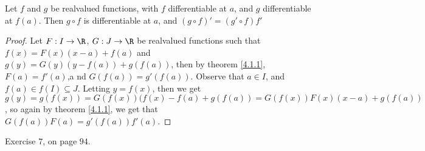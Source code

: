 \begin{theorem}\label{4.2.2}
    Let $f$ and  $g$ be realvalued functions, with  $f$ differentiable at  $a$, 
    and  $g$ differentiable at  $f(a)$. Then  $g \circ f$ is differentiable at  $a$, 
    and  $(g \circ f)'=(g' \circ f)f'$
\end{theorem}
\begin{proof}
    Let $F:I \rightarrow \R$, $G: J \rightarrow \R$ be realvalued functions such that $f(x)=F(x)(x-a)+f(a)$ 
    and  $g(y)=G(y)(y-f(a))+g(f(a))$, then by theorem \ref{4.1.1},  $F(a)=f'(a)$,a nd  $G(f(a))=g'(f(a))$. 
    Observe that $a \in I$, and  $f(a) \in f(I) \subseteq J$. Letting  $y=f(x)$, then we get 
    $g(y)=g(f(x))=G(f(x))(f(x)-f(a)+g(f(a))=G(f(x))F(x)(x-a)+g(f(a))$, so again by theorem 
    \ref{4.1.1}, we get that  $G(f(a))F(a)=g'(f(a))f'(a)$.
\end{proof}

\begin{HW} 
    Exercise $7$, on page  $94$.
\end{HW}
